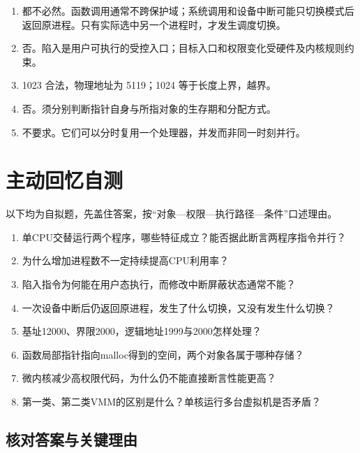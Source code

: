 \begin{enumerate}
\def\labelenumi{\arabic{enumi}.}
\tightlist
\item
  都不必然。函数调用通常不跨保护域；系统调用和设备中断可能只切换模式后返回原进程。只有实际选中另一个进程时，才发生调度切换。
\item
  否。陷入是用户可执行的受控入口；目标入口和权限变化受硬件及内核规则约束。
\item
  1023 合法，物理地址为 5119；1024 等于长度上界，越界。
\item
  否。须分别判断指针自身与所指对象的生存期和分配方式。
\item
  不要求。它们可以分时复用一个处理器，并发而非同一时刻并行。
\end{enumerate}

\section{主动回忆自测}\label{OS01-recall}

以下均为自拟题，先盖住答案，按``对象---权限---执行路径---条件''口述理由。

\begin{recallcard}[功能、权限与结构的综合辨析]

\begin{enumerate}
\def\labelenumi{\arabic{enumi}.}
\tightlist
\item
  单CPU交替运行两个程序，哪些特征成立？能否据此断言两程序指令并行？
\item
  为什么增加进程数不一定持续提高CPU利用率？
\item
  陷入指令为何能在用户态执行，而修改中断屏蔽状态通常不能？
\item
  一次设备中断后仍返回原进程，发生了什么切换，又没有发生什么切换？
\item
  基址12000、界限2000，逻辑地址1999与2000怎样处理？
\item
  函数局部指针指向malloc得到的空间，两个对象各属于哪种存储？
\item
  微内核减少高权限代码，为什么仍不能直接断言性能更高？
\item
  第一类、第二类VMM的区别是什么？单核运行多台虚拟机是否矛盾？
\end{enumerate}

\end{recallcard}

\subsection{核对答案与关键理由}\label{OS01-recall-answers}

